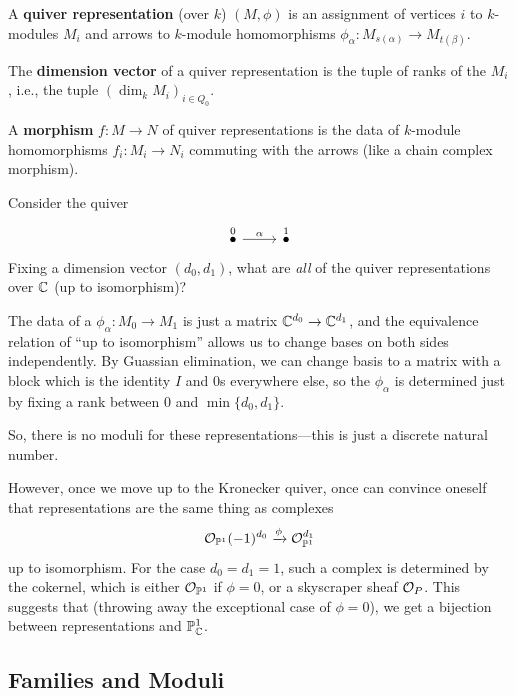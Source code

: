 \documentclass[12pt]{article}
\begin{document}
\begin{defn}
    A \textbf{quiver representation} (over $k$) $(M,\phi)$ is an assignment of vertices $i$ to $k$-modules $M_i$ and arrows to $k$-module homomorphisms $\phi_\alpha: M_{s(\alpha)} \to M_{t(\beta)}$.

    The \textbf{dimension vector} of a quiver representation is the tuple of ranks of the $M_i$, i.e., the tuple $(\dim_k M_i)_{i\in Q_0}$.

    A \textbf{morphism} $f:M\to N$ of quiver representations is the data of $k$-module homomorphisms $f_i: M_i \to N_i$ commuting with the arrows (like a chain complex morphism).
\end{defn}

\begin{eg}
    Consider the quiver
    \[\begin{tikzcd}
        \overset{0}{\bullet} \rar["\alpha"] & \overset{1}{\bullet}
    \end{tikzcd}\]
    Fixing a dimension vector $(d_0,d_1)$, what are \textit{all} of the quiver representations over $\mathbb{C}$ (up to isomorphism)?

    The data of a $\phi_\alpha: M_0 \to M_1$ is just a matrix $\mathbb{C}^{d_0} \to \mathbb{C}^{d_1}$, and the equivalence relation of ``up to isomorphism'' allows us to change bases on both sides independently. By Guassian elimination, we can change basis to a matrix with a block which is the identity $I$ and $0$s everywhere else, so the $\phi_\alpha$ is determined just by fixing a rank between $0$ and $\min\{d_0,d_1\}$.

    So, there is no moduli for these representations---this is just a discrete natural number.
\end{eg}

\begin{eg}
    However, once we move up to the Kronecker quiver, once can convince oneself that representations are the same thing as complexes
    \[\cO_{\P^1}(-1)^{d_0} \xrightarrow{\phi} \cO_{\P^1}^{d_1}\]
    up to isomorphism. For the case $d_0=d_1=1$, such a complex is determined by the cokernel, which is either $\mathcal{O}_{\mathbb{P}^1}$ if $\phi=0$, or a skyscraper sheaf $\mathcal{O}_P$. This suggests that (throwing away the exceptional case of $\phi=0$), we get a bijection between representations and $\mathbb{P}_{\mathbb{C}}^1$.
\end{eg}

\subsection{Families and Moduli}
\end{document}
